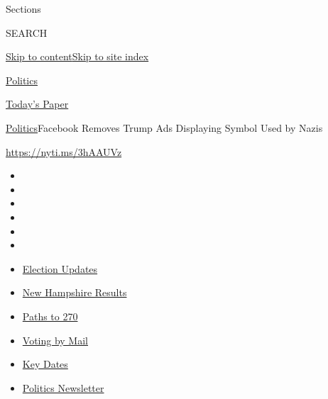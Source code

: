 Sections

SEARCH

\protect\hyperlink{site-content}{Skip to
content}\protect\hyperlink{site-index}{Skip to site index}

\href{https://www.nytimes3xbfgragh.onion/section/politics}{Politics}

\href{https://myaccount.nytimes3xbfgragh.onion/auth/login?response_type=cookie\&client_id=vi}{}

\href{https://www.nytimes3xbfgragh.onion/section/todayspaper}{Today's
Paper}

\href{/section/politics}{Politics}\textbar{}Facebook Removes Trump Ads
Displaying Symbol Used by Nazis

\url{https://nyti.ms/3hAAUVz}

\begin{itemize}
\item
\item
\item
\item
\item
\item
\end{itemize}

\begin{itemize}
\item
  \href{https://www.nytimes3xbfgragh.onion/live/2020/09/09/us/trump-vs-biden?action=click\&pgtype=Article\&state=default\&region=TOP_BANNER\&context=storylines_menu}{Election
  Updates}
\item
  \href{https://www.nytimes3xbfgragh.onion/interactive/2020/09/08/us/elections/results-new-hampshire-primary-elections.html?action=click\&pgtype=Article\&state=default\&region=TOP_BANNER\&context=storylines_menu}{New
  Hampshire Results}
\item
  \href{https://www.nytimes3xbfgragh.onion/interactive/2020/us/elections/election-states-biden-trump.html?action=click\&pgtype=Article\&state=default\&region=TOP_BANNER\&context=storylines_menu}{Paths
  to 270}
\item
  \href{https://www.nytimes3xbfgragh.onion/interactive/2020/08/31/us/politics/vote-by-mail-deadlines.html?action=click\&pgtype=Article\&state=default\&region=TOP_BANNER\&context=storylines_menu}{Voting
  by Mail}
\item
  \href{https://www.nytimes3xbfgragh.onion/interactive/2019/us/elections/2020-presidential-election-calendar.html?action=click\&pgtype=Article\&state=default\&region=TOP_BANNER\&context=storylines_menu}{Key
  Dates}
\item
  \href{https://www.nytimes3xbfgragh.onion/newsletters/politics?action=click\&pgtype=Article\&state=default\&region=TOP_BANNER\&context=storylines_menu}{Politics
  Newsletter}
\end{itemize}

